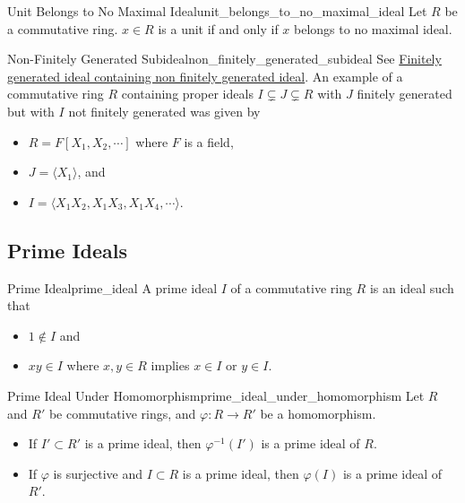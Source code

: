 \documentclass{article}
\begin{document}
\begin{corollary}{Unit Belongs to No Maximal Ideal}{unit_belongs_to_no_maximal_ideal}
    Let $R$ be a commutative ring.
    $x\in R$ is a unit if and only if $x$ belongs to no maximal ideal.
\end{corollary}

\begin{counterexample}{Non-Finitely Generated Subideal}{non_finitely_generated_subideal}
    See \href{https://math.stackexchange.com/questions/1206194/finitely-generated-ideal-containing-non-finitely-generated-ideal}{Finitely generated ideal containing non finitely generated ideal}.
    An example of a commutative ring $R$ containing proper ideals $I\subsetneq J \subsetneq R$ with $J$ finitely generated but with $I$ not finitely generated was given by
    \begin{itemize}
        \item $R = F[X_1,X_2,\cdots]$ where $F$ is a field,
        \item $J = \langle X_1 \rangle$, and
        \item $I = \langle X_1 X_2, X_1 X_3, X_1 X_4,\cdots \rangle$.
    \end{itemize}
\end{counterexample}

\subsection{Prime Ideals}

\begin{definition}{Prime Ideal}{prime_ideal}
    A prime ideal $I$ of a commutative ring $R$ is an ideal such that 
    \begin{itemize}
        \item $1\notin I$ and
        \item $xy \in I$ where $x,y\in R$ implies $x\in I$ or $y\in I$.
    \end{itemize}
\end{definition}

\begin{proposition}{Prime Ideal Under Homomorphism}{prime_ideal_under_homomorphism}
    Let $R$ and $R'$ be commutative rings, and $\varphi: R\rightarrow R'$ be a homomorphism.
    \begin{itemize}
        \item If $I'\subset R'$ is a prime ideal, then $\varphi^{-1}(I')$ is a prime ideal of $R$.
        \item If $\varphi$ is surjective and $I\subset R$ is a prime ideal, then $\varphi(I)$ is a prime ideal of $R'$.
    \end{itemize}
\end{proposition}
\end{document}

